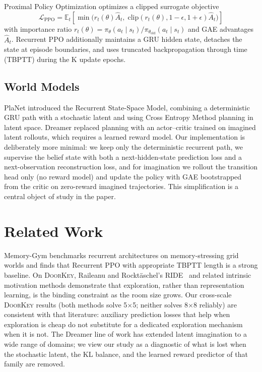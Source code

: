\documentclass[letterpaper]{article}
\begin{document}
Proximal Policy Optimization \cite{schulman2017ppo} optimizes a clipped
surrogate objective
\begin{equation*}
    \mathcal{L}_{\text{PPO}} = \mathbb{E}_t\!\left[\min\!\big(r_t(\theta) \hat A_t,\;
    \text{clip}(r_t(\theta), 1{-}\epsilon, 1{+}\epsilon)\hat A_t\big)\right]
\end{equation*}
with importance ratio $r_t(\theta) = \pi_\theta(a_t \mid s_t) / \pi_{\theta_\text{old}}(a_t \mid s_t)$
and GAE advantages $\hat A_t$. Recurrent PPO additionally maintains a GRU
hidden state, detaches the state at episode boundaries, and uses truncated
backpropagation through time (TBPTT) during the K update epochs.

\subsection{World Models}

PlaNet \cite{hafner2019planet} introduced the Recurrent State-Space Model,
combining a deterministic GRU path with a stochastic latent and using
Cross Entropy Method planning in latent space. Dreamer
\cite{hafner2020dreamer} replaced planning with an actor--critic trained
on imagined latent rollouts, which requires a learned reward model.
Our implementation is deliberately more minimal: we keep only the
deterministic recurrent path, we supervise the belief state with both a
next-hidden-state prediction loss and a next-observation reconstruction
loss, and for imagination we rollout the transition head only (no reward
model) and update the policy with GAE bootstrapped from the critic on
zero-reward imagined trajectories. This simplification is a central object
of study in the paper.

\section{Related Work}

Memory-Gym \cite{pleines2023memorygym} benchmarks recurrent architectures
on memory-stressing grid worlds and finds that Recurrent PPO with
appropriate TBPTT length is a strong baseline. On \textsc{DoorKey}, Raileanu
and Rockt{\"a}schel's RIDE~\cite{raileanu2020ride} and related intrinsic
motivation methods demonstrate that exploration, rather than representation
learning, is the binding constraint as the room size grows. Our
cross-scale \textsc{DoorKey} results (both methods solve 5$\times$5;
neither solves 8$\times$8 reliably) are consistent with that literature:
auxiliary prediction losses that help when exploration is cheap do not
substitute for a dedicated exploration mechanism when it is not. The
Dreamer line of work
\cite{hafner2020dreamer, hafner2021dreamerv2, hafner2023dreamerv3} has
extended latent imagination to a wide range of domains; we view our study
as a diagnostic of what is lost when the stochastic latent, the KL balance,
and the learned reward predictor of that family are removed.
\end{document}
